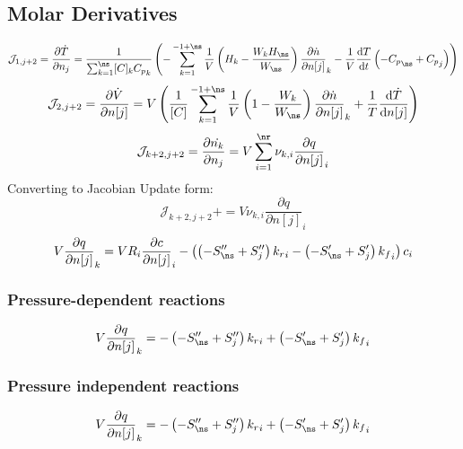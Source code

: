 \documentclass[a4paper,10pt]{article}
\newcommand{\pluseq}{\mathrel{{+}{=}}}
\begin{document}
\subsection{Molar Derivatives}
\begin{dmath} \mathcal{J}_{1,j + 2} = \frac{\partial\dot{T}}{\partial{n_j}} = \frac{1}{\sum_{k=1}^{\ns} [C]_{k} {C_p}_{k}} \left(- \sum_{k=1}^{-1 + \ns} \frac{1}{V} \left(H_{k} - \frac{W_{k} H_{\ns}}{W_{\ns}}\right) \frac{\partial \dot{n} }{\partial n[j] }_{k} - \frac{1}{V} \frac{\text{d} T }{\text{d} t } \left(- {C_p}_{\ns} + {C_p}_{j}\right)\right)\end{dmath} 
\begin{dmath} \mathcal{J}_{2,j + 2} = \frac{\partial \dot{ V } }{\partial n[j] } = V \left(\frac{1}{[C]} \sum_{k=1}^{-1 + \ns} \frac{1}{V} \left(1 - \frac{W_{k}}{W_{\ns}}\right) \frac{\partial \dot{n} }{\partial n[j] }_{k} + \frac{1}{T} \frac{\text{d} \dot{T} }{\text{d} n[j] }\right)\end{dmath} 
\begin{dmath} \mathcal{J}_{k + 2,j + 2} = \frac{\partial \dot{n_k} }{\partial n_{j} } = V \sum_{i=1}^{\nr} \nu_{k,i} \frac{\partial q }{\partial n[j] }_{i}\end{dmath} 
Converting to Jacobian Update form:
\begin{dmath} \mathcal{J}_{k + 2,j + 2}\pluseq V \nu_{k,i} \frac{\partial q }{\partial n[j] }_{i}\end{dmath} 
\begin{dmath} V \frac{\partial q }{\partial n[j] }_{k} = V R_{i} \frac{\partial c }{\partial n[j] }_{i} - \left(\left(- S^{\prime\prime}_{\ns} + S^{\prime\prime}_{j}\right) {k_r}_{i} - \left(- S^{\prime}_{\ns} + S^{\prime}_{j}\right) {k_f}_{i}\right) c_{i}\end{dmath} 
\subsubsection{Pressure-dependent reactions}
\begin{dmath} V \frac{\partial q }{\partial n[j] }_{k} = - \left(- S^{\prime\prime}_{\ns} + S^{\prime\prime}_{j}\right) {k_r}_{i} + \left(- S^{\prime}_{\ns} + S^{\prime}_{j}\right) {k_f}_{i}\end{dmath} 
\subsubsection{Pressure independent reactions}
\begin{dmath} V \frac{\partial q }{\partial n[j] }_{k} = - \left(- S^{\prime\prime}_{\ns} + S^{\prime\prime}_{j}\right) {k_r}_{i} + \left(- S^{\prime}_{\ns} + S^{\prime}_{j}\right) {k_f}_{i}\end{dmath} 
\end{document}
